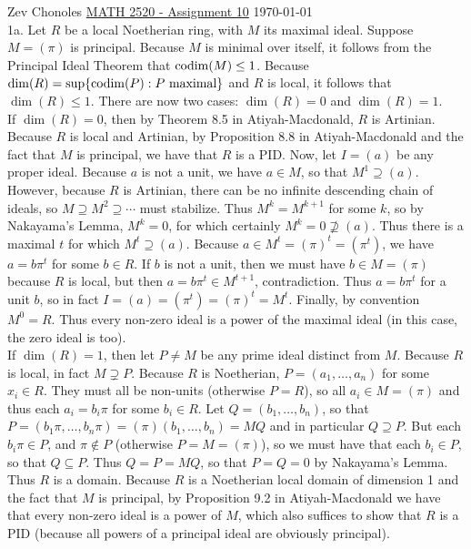 \documentclass[11pt]{article}
\begin{document}
Zev Chonoles \hfill 
\underline{MATH 2520 - Assignment 10} \hfill \today\\

\num{1a.} Let $R$ be a local Noetherian ring, with $M$ its maximal ideal. Suppose $M=(\pi)$ is principal. Because $M$ is minimal over itself, it follows from the Principal Ideal Theorem that $\operatorname{codim}(M)\leq1$. Because $\operatorname{dim}(R)=\sup\{\operatorname{codim}(P):P\text{ maximal}\}$ and $R$ is local, it follows that $\dim(R)\leq1$. There are now two cases: $\dim(R)=0$ and $\dim(R)=1$.\\

If $\dim(R)=0$, then by Theorem 8.5 in Atiyah-Macdonald, $R$ is Artinian. Because $R$ is local and Artinian, by Proposition 8.8 in Atiyah-Macdonald and the fact that $M$ is principal, we have that $R$ is a PID. Now, let $I=(a)$ be any proper ideal. Because $a$ is not a unit, we have $a\in M$, so that $M^1\supseteq (a)$. However, because $R$ is Artinian, there can be no infinite descending chain of ideals, so $M\supseteq M^2\supseteq\cdots$ must stabilize. Thus $M^k=M^{k+1}$ for some $k$, so by Nakayama's Lemma, $M^k=0$, for which certainly $M^k=0\not\supseteq(a)$. Thus there is a maximal $t$ for which $M^t\supseteq(a)$. Because $a\in M^t=(\pi)^t=(\pi^t)$, we have $a=b\pi^t$ for some $b\in R$. If $b$ is not a unit, then we must have $b\in M=(\pi)$ because $R$ is local, but then $a=b\pi^t\in M^{t+1}$, contradiction. Thus $a=b\pi^t$ for a unit $b$, so in fact $I=(a)=(\pi^t)=(\pi)^t=M^t$. Finally, by convention $M^0=R$. Thus every non-zero ideal is a power of the maximal ideal (in this case, the zero ideal is too).\\

If $\dim(R)=1$, then let $P\neq M$ be any prime ideal distinct from $M$. Because $R$ is local, in fact $M\supsetneq P$. Because $R$ is Noetherian, $P=(a_1,\ldots,a_n)$ for some $x_i\in R$. They must all be non-units (otherwise $P=R$), so all $a_i\in M=(\pi)$ and thus each $a_i=b_i\pi$ for some $b_i\in R$. Let $Q=(b_1,\ldots,b_n)$, so that $P=(b_1\pi,\ldots,b_n\pi)=(\pi)(b_1,\ldots,b_n)=MQ$ and in particular $Q\supseteq P$. But each $b_i\pi\in P$, and $\pi\notin P$ (otherwise $P=M=(\pi)$), so we must have that each $b_i\in P$, so that $Q\subseteq P$. Thus $Q=P=MQ$, so that $P=Q=0$ by Nakayama's Lemma. Thus $R$ is a domain. Because $R$ is a Noetherian local domain of dimension 1 and the fact that $M$ is principal, by Proposition 9.2 in Atiyah-Macdonald we have that every non-zero ideal is a power of $M$, which also suffices to show that $R$ is a PID (because all powers of a principal ideal are obviously principal).  \\
\end{document}
